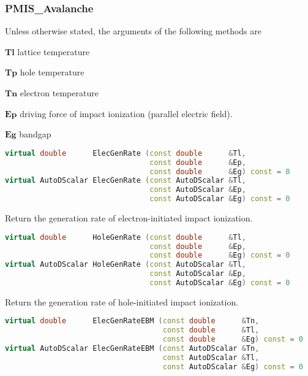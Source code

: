 \documentclass[oneside,12pt]{cgd_book}
\begin{document}
\subsubsection{PMIS\_Avalanche}
\label{sec:Extend:PMI:Ref:PMIS:Avalanche}
Unless otherwise stated, the arguments of the following methods are
\par
\begin{compactitem}
\item $\mathbf{Tl}$ lattice temperature
\par
\item $\mathbf{Tp}$ hole temperature
\par
\item $\mathbf{Tn}$ electron temperature
\par
\item $\mathbf{Ep}$ driving force of impact ionization (parallel electric field).
\par
\item $\mathbf{Eg}$ bandgap
\par
\end{compactitem}
\begin{lstlisting}[language={C++}]
virtual double      ElecGenRate (const double      &Tl,
                                 const double      &Ep,
                                 const double      &Eg) const = 0
virtual AutoDScalar ElecGenRate (const AutoDScalar &Tl,
                                 const AutoDScalar &Ep,
                                 const AutoDScalar &Eg) const = 0
\end{lstlisting}
Return the generation rate of electron-initiated impact ionization.
\par
\begin{lstlisting}[language={C++}]
virtual double      HoleGenRate (const double      &Tl,
                                 const double      &Ep,
                                 const double      &Eg) const = 0
virtual AutoDScalar HoleGenRate (const AutoDScalar &Tl,
                                 const AutoDScalar &Ep,
                                 const AutoDScalar &Eg) const = 0
\end{lstlisting}
Return the generation rate of hole-initiated impact ionization.
\par
\begin{lstlisting}[language={C++}]
virtual double      ElecGenRateEBM (const double      &Tn,
                                    const double      &Tl,
                                    const double      &Eg) const = 0
virtual AutoDScalar ElecGenRateEBM (const AutoDScalar &Tn,
                                    const AutoDScalar &Tl,
                                    const AutoDScalar &Eg) const = 0
\end{lstlisting}
\end{document}
